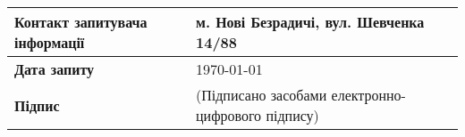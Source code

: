 \documentclass[a4paper,12pt]{article}
\begin{document}
  \begin{tabular}{| p{} | p{} |}
    \hline
    \textbf{Контакт запитувача інформації} & м. Нові Безрадичі, вул. Шевченка 14/88 \\
    \hline
    \textbf{Дата запиту} & \today \\
    \hline
    \textbf{Підпис} & (Підписано засобами електронно-цифрового підпису) \\
    \hline
  \end{tabular}\\\\
\end{document}
